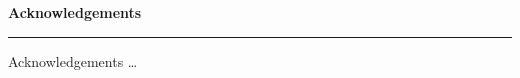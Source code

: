 \newpage
\thispagestyle{empty}


\begin{titlepage}


\begin{flushleft}
{\Large \bf
Acknowledgements 
}

\vspace{0.01cm}

\rule{\linewidth}{0.05cm}%

\end{flushleft}

{
Acknowledgements \ldots
}

\end{titlepage}
